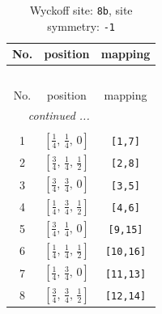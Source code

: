 \documentclass[fleqn,8pt]{jsarticle}
\begin{document}
\begin{longtable}{ccc}
\caption{Wyckoff site: {\tt 8b}, site symmetry: {\tt -1}}
 \\
 \hline \hline
No. & position & mapping \\ \hline \endfirsthead

\multicolumn{2}{l}{\tablename\ \thetable{}} \\
 \hline \hline
No. & position & mapping \\ \hline \endhead

 \hline \hline
\multicolumn{2}{r}{\footnotesize\it continued ...} \\ \endfoot

 \hline \hline
\multicolumn{2}{r}{} \\ \endlastfoot

1 & $\left[ \frac{1}{4},\, \frac{1}{4},\, 0 \right]$ & {\tt [1,7]} \\ \hline
2 & $\left[ \frac{3}{4},\, \frac{1}{4},\, \frac{1}{2} \right]$ & {\tt [2,8]} \\ \hline
3 & $\left[ \frac{3}{4},\, \frac{3}{4},\, 0 \right]$ & {\tt [3,5]} \\ \hline
4 & $\left[ \frac{1}{4},\, \frac{3}{4},\, \frac{1}{2} \right]$ & {\tt [4,6]} \\ \hline
5 & $\left[ \frac{3}{4},\, \frac{1}{4},\, 0 \right]$ & {\tt [9,15]} \\ \hline
6 & $\left[ \frac{1}{4},\, \frac{1}{4},\, \frac{1}{2} \right]$ & {\tt [10,16]} \\ \hline
7 & $\left[ \frac{1}{4},\, \frac{3}{4},\, 0 \right]$ & {\tt [11,13]} \\ \hline
8 & $\left[ \frac{3}{4},\, \frac{3}{4},\, \frac{1}{2} \right]$ & {\tt [12,14]} \\
\end{longtable}
\renewcommand{\arraystretch}{1.2}
\end{document}
